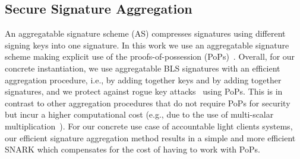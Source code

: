 \subsection{Secure Signature Aggregation}
\label{sec:multisig_short}
\vspace{-0.03in}
An aggregatable signature scheme (AS) compresses signatures using
different signing keys into one signature. In this work we use an aggregatable 
signature scheme making explicit use of the proofs-of-possession (PoPs)~\cite{proofs_of_posession}.
Overall, for our concrete instantiation, we use aggregatable BLS signatures with an 
efficient aggregation procedure, i.e., by adding together keys and by adding together 
signatures, and we protect against rogue key attacks~\cite{proofs_of_posession} using PoPs. 
This is in contrast to other aggregation procedures that do not require PoPs for security 
but incur a higher computational cost (e.g., due to the use of multi-scalar
multiplication~\cite{boneh_compact_multisig}). For our concrete use case of accountable 
light clients systems, our efficient signature aggregation method results 
in a simple and more efficient SNARK which compensates for the cost of having to work with PoPs. 
\vspace{-0.1in}
